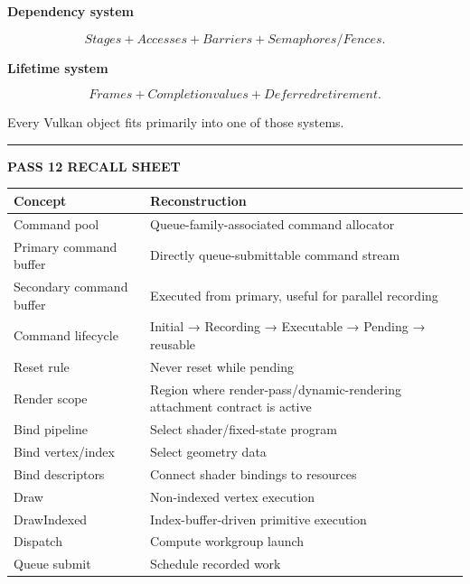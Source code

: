 \textbf{Dependency system}

\[
Stages
+
Accesses
+
Barriers
+
Semaphores/Fences.
\]

\textbf{Lifetime system}

\[
Frames
+
Completion values
+
Deferred retirement.
\]

Every Vulkan object fits primarily into one of those systems.

\begin{center}\rule{0.5\linewidth}{0.5pt}\end{center}

\textbf{PASS 12 RECALL SHEET}

{\def\LTcaptype{none} %
\begin{longtable}[]{@{}
  >{\raggedright\arraybackslash}p{}
  >{\raggedright\arraybackslash}p{}@{}}
\toprule\noalign{}
\begin{minipage}[b]{\linewidth}\raggedright
Concept
\end{minipage} & \begin{minipage}[b]{\linewidth}\raggedright
Reconstruction
\end{minipage} \\
\midrule\noalign{}
\endhead
\bottomrule\noalign{}
\endlastfoot
Command pool & Queue-family-associated command allocator \\
Primary command buffer & Directly queue-submittable command stream \\
Secondary command buffer & Executed from primary, useful for parallel recording \\
Command lifecycle & Initial → Recording → Executable → Pending → reusable \\
Reset rule & Never reset while pending \\
Render scope & Region where render-pass/dynamic-rendering attachment contract is active \\
Bind pipeline & Select shader/fixed-state program \\
Bind vertex/index & Select geometry data \\
Bind descriptors & Connect shader bindings to resources \\
Draw & Non-indexed vertex execution \\
DrawIndexed & Index-buffer-driven primitive execution \\
Dispatch & Compute workgroup launch \\
Queue submit & Schedule recorded work \\

\end{longtable}}
